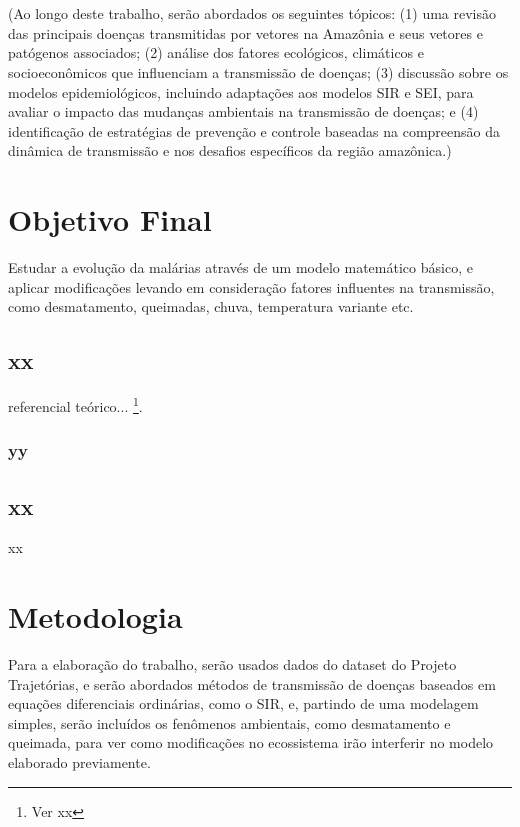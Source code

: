 \documentclass[12pt]{article}
\begin{document}
\\\\
(Ao longo deste trabalho, serão abordados os seguintes tópicos: (1) uma revisão das principais doenças transmitidas por vetores na Amazônia e seus vetores e patógenos associados; (2) análise dos fatores ecológicos, climáticos e socioeconômicos que influenciam a transmissão de doenças; (3) discussão sobre os modelos epidemiológicos, incluindo adaptações aos modelos SIR e SEI, para avaliar o impacto das mudanças ambientais na transmissão de doenças; e (4) identificação de estratégias de prevenção e controle baseadas na compreensão da dinâmica de transmissão e nos desafios específicos da região amazônica.)

\newpage
\section{Objetivo Final}

Estudar a evolução da malárias através de um modelo matemático básico, e aplicar modificações levando em consideração fatores influentes na transmissão, como desmatamento, queimadas, chuva, temperatura variante etc.

\subsection{xx}

referencial teórico... \footnote{Ver xx}.

\subsubsection{yy}

\newpage
\subsection{xx}

xx

\newpage
\section{Metodologia}

Para a elaboração do trabalho, serão usados dados do dataset do Projeto Trajetórias, e serão abordados métodos de transmissão de doenças baseados em equações diferenciais ordinárias, como o SIR, e, partindo de uma modelagem simples, serão incluídos os fenômenos ambientais, como desmatamento e queimada, para ver como modificações no ecossistema irão interferir no modelo elaborado previamente.
\end{document}
